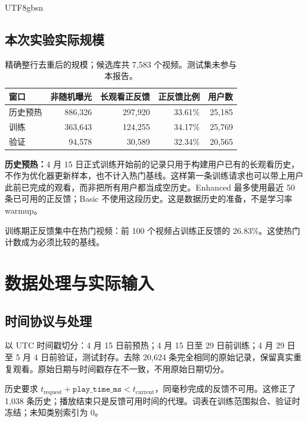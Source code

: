\documentclass[10pt,a4paper]{article}
\begin{document}
\begin{CJK*}{UTF8}{gbsn}
\subsection{本次实验实际规模}
\begin{table}[H]\centering\small
\begin{tabular}{lrrrr}\toprule
窗口 & 非随机曝光 & 长观看正反馈 & 正反馈比例 & 用户数\\\midrule
历史预热 & 886,326 & 297,920 & 33.61\% & 25,185\\
训练 & 363,643 & 124,255 & 34.17\% & 25,769\\
验证 & 94,578 & 30,589 & 32.34\% & 20,565\\\bottomrule
\end{tabular}\caption{精确整行去重后的规模；候选库共 7,583 个视频。测试集未参与本报告。}\end{table}
\textbf{历史预热：}4 月 15 日正式训练开始前的记录只用于构建用户已有的长观看历史，不作为优化器更新样本，也不计入热门基线。这样第一条训练请求也可以带上用户此前已完成的观看，而非把所有用户都当成空历史。Enhanced 最多使用最近 50 条已可用的正反馈；Basic 不使用这段历史。这是数据历史的准备，不是学习率 warmup。

训练期正反馈集中在热门视频：前 100 个视频占训练正反馈的 26.83\%。这使热门计数成为必须比较的基线。

\clearpage
\section{数据处理与实际输入}
\subsection{时间协议与处理}
以 UTC 时间戳切分：4 月 15 日前预热；4 月 15 日至 29 日前训练；4 月 29 日至 5 月 4 日前验证，测试封存。去除 20,624 条完全相同的原始记录，保留真实重复观看。原始日期与时间戳存在不一致，不用原始日期切分。

历史要求 $t_{\mathrm{request}}+\texttt{play\_time\_ms}<t_{\mathrm{current}}$，同毫秒完成的反馈不可用。这修正了 1,038 条历史；播放结束只是反馈可用时间的代理。词表在训练范围拟合、验证时冻结；未知类别索引为 0。


\end{CJK*}
\end{document}
